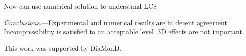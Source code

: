 \documentclass[twocolumn,showpacs,pre,preprintnumbers,floatfix]{revtex4-1}
\begin{document}
Now can use numerical solution to understand LCS


{\em Conclusions.}---Experimental and numerical results are in decent
agreement.  Incompressibility is satisfied to an acceptable level.  3D
effects are not important




This work was supported by DiaMonD.



\end{document}
